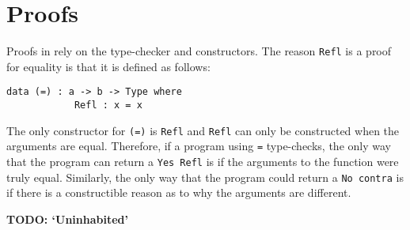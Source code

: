 \section{Proofs}
    Proofs in \Idris rely on the type-checker and constructors. The reason \texttt{Refl} is a proof for equality is that it is defined as follows:
    \begin{lstlisting}[caption={Reflexivity as defined in the \Idris prelude \cite{brady_2017}}]
        data (=) : a -> b -> Type where
            Refl : x = x
    \end{lstlisting}
    The only constructor for \texttt{(=)} is \texttt{Refl} and \texttt{Refl} can only be constructed when the arguments are equal. Therefore, if a program using \texttt{=} type-checks, the only way that the program can return a \texttt{Yes Refl} is if the arguments to the function were truly equal. Similarly, the only way that the program could return a \texttt{No contra} is if there is a constructible reason as to why the arguments are different.
    
    \textbf{TODO: `Uninhabited'}

